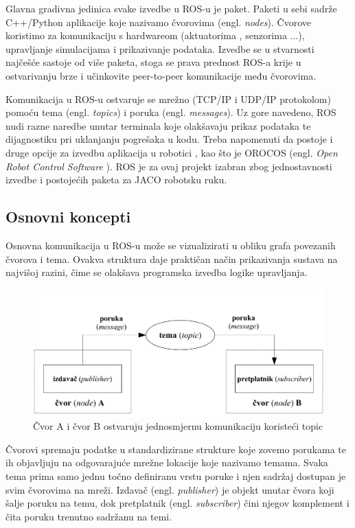 \documentclass[times, utf8, diplomski, numeric]{fer}
\begin{document}
Glavna gradivna jedinica svake izvedbe u ROS-u je paket.
Paketi u sebi sadrže C++/Python aplikacije koje nazivamo čvorovima (engl. \textit{nodes}).
Čvorove koristimo za komunikaciju s hardwareom (aktuatorima , senzorima ...), upravljanje simulacijama i prikazivanje podataka.
Izvedbe se u stvarnosti najčešće sastoje od više paketa, stoga se prava prednost ROS-a krije u ostvarivanju brze i učinkovite peer-to-peer komunikacije među čvorovima.
 
Komunikacija u ROS-u ostvaruje se mrežno (TCP/IP i UDP/IP protokolom) pomoću tema (engl. \textit{topics}) i poruka (engl. \textit{messages}).
Uz gore navedeno, ROS nudi razne naredbe unutar terminala koje olakšavaju prikaz podataka te dijagnostiku pri uklanjanju pogrešaka u kodu. Treba napomenuti da postoje i druge opcije za izvedbu aplikacija u robotici , kao što je OROCOS (engl. \textit{Open Robot Control Software} ). ROS je za ovaj projekt izabran zbog jednostavnosti izvedbe i postojećih paketa za JACO robotsku ruku.
\subsection{Osnovni koncepti}
Osnovna komunikacija u ROS-u može se vizualizirati u obliku grafa povezanih čvorova i tema. Ovakva struktura daje praktičan način prikazivanja sustava na najvišoj razini, čime se olakšava programska izvedba logike upravljanja. 

\begin{figure}[h!]
\begin{center}
\includegraphics[width=\textwidth]{ros_shema}
\caption{Čvor A i čvor B ostvaruju jednosmjernu komunikaciju koristeći topic}
\end{center}
\end{figure}

Čvorovi spremaju podatke u standardizirane strukture koje zovemo porukama te ih objavljuju na odgovarajuće mrežne lokacije koje nazivamo temama. 
Svaka tema prima samo jednu točno definiranu vrstu poruke i njen sadržaj dostupan je svim čvorovima na mreži.
Izdavač (engl. \textit{publisher}) je objekt unutar čvora koji šalje poruku na temu, dok pretplatnik (engl. \textit{subscriber}) čini njegov komplement i čita poruku trenutno sadržanu na temi.
\end{document}
